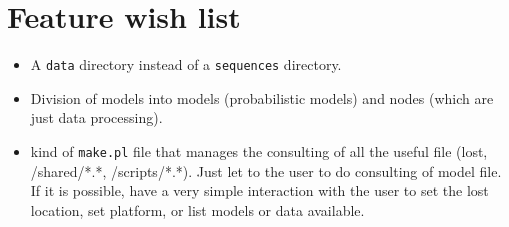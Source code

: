 \documentclass{book}
\begin{document}
\section{Feature wish list}

\begin{itemize}
\item A \texttt{data} directory instead of a \texttt{sequences}
  directory.
\item Division of models into models (probabilistic models) and nodes
  (which are just data processing).
\item kind of \texttt{make.pl} file that manages the consulting of all the
useful file (lost, /shared/*.*, /scripts/*.*). Just let to the user
to do consulting of model file. If it is possible, have a very simple
interaction with the user to set the lost location, set platform, or list
models or data available.
\end{itemize}



\printindex
\end{document}
